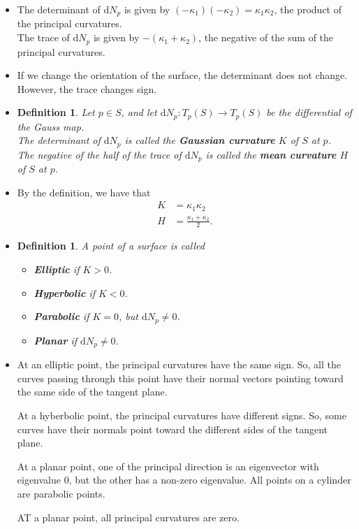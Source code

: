 \documentclass[10pt]{article}
\newtheorem{definition}[lemma]{Definition}
\newcommand{\dee}{\mathrm{d}}
\newcommand{\ra}{\rightarrow}
\begin{document}
\begin{itemize}
    \item The determinant of $\dee N_p$ is given by $(-\kappa_1)(-\kappa_2) = \kappa_1 \kappa_2$, the product of the principal curvatures.\\
    The trace of $\dee N_p$ is given by $-(\kappa_1 + \kappa_2)$, the negative of the sum of the principal curvatures.

    \item If we change the orientation of the surface, the determinant does not change. However, the trace changes sign.

    \item \begin{definition}
      Let $p \in S$, and let $\dee N_p: T_p(S) \ra T_p(S)$ be the differential of the Gauss map.\\
      The determinant of $\dee N_p$ is called the {\bf Gaussian curvature} $K$ of $S$ at $p$.\\
      The negative of the half of the trace of $\dee N_p$ is called the {\bf mean curvature} $H$ of $S$ at $p$.
    \end{definition}

    \item By the definition, we have that
    \begin{align*}
      K &= \kappa_1 \kappa_2\\
      H &= \frac{\kappa_1 + \kappa_2}{2}.
    \end{align*}

    \item \begin{definition}
      A point of a surface is called
      \begin{itemize}
        \item {\bf Elliptic} if $K > 0$.
        \item {\bf Hyperbolic} if $K < 0$.
        \item {\bf Parabolic} if $K =0$, but $\dee N_p \neq 0$.
        \item {\bf Planar} if $\dee N_p \neq 0$.
      \end{itemize}      
    \end{definition}

    \item At an elliptic point, the principal curvatures have the same sign. So, all the curves passing through this point have their normal vectors pointing toward the same side of the tangent plane.

    At a hyberbolic point, the principal curvatures have different signs. So, some curves have their normals point toward the different sides of the tangent plane.

    At a planar point, one of the principal direction is an eigenvector with eigenvalue $0$, but the other has a non-zero eigenvalue. All points on a cylinder are parabolic points.

    AT a planar point, all principal curvatures are zero.    
  \end{itemize}  
\end{document}
